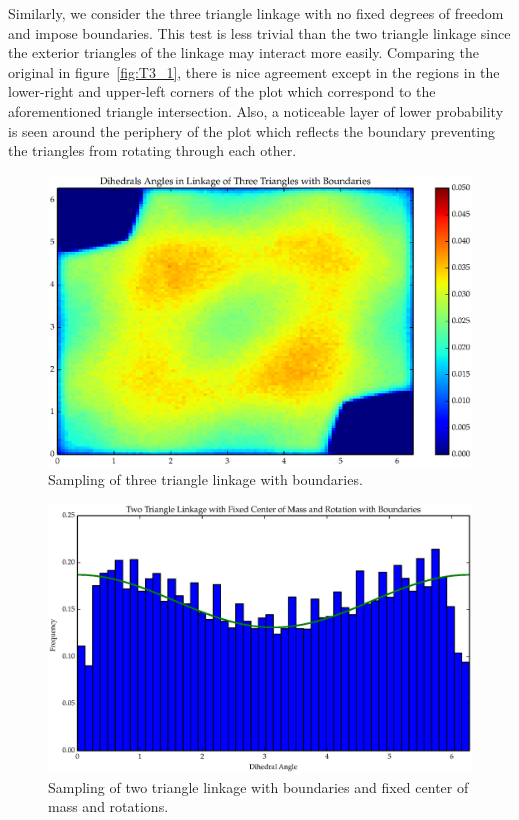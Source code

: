 Similarly, we consider the three triangle linkage with no fixed degrees of freedom and impose boundaries. This test is less trivial than the two triangle linkage since the exterior triangles of the linkage may interact more easily. Comparing the original in figure~\ref{fig:T3_1}, there is nice agreement except in the regions in the lower-right and upper-left corners of the plot which correspond to the aforementioned triangle intersection. Also, a noticeable layer of lower probability is seen around the periphery of the plot which reflects the boundary preventing the triangles from rotating through each other.
\begin{figure}[ht]
\centering
  \includegraphics[scale=0.6]{images/T3_2_2D.eps}
\caption{Sampling of three triangle linkage with boundaries.}
\label{fig:T3_2}
\end{figure}


\begin{figure}[ht]
\centering
  \includegraphics[scale=0.6]{images/T2_6.eps}
\caption{Sampling of two triangle linkage with boundaries and fixed center of mass and rotations.}
\label{fig:T2_6}
\end{figure}

